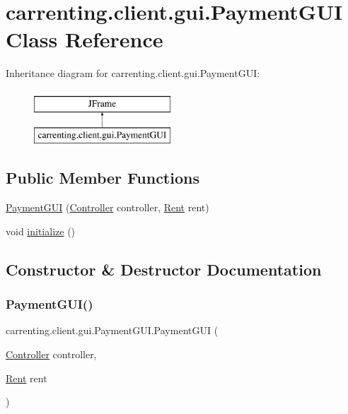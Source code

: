\hypertarget{classcarrenting_1_1client_1_1gui_1_1_payment_g_u_i}{}\section{carrenting.\+client.\+gui.\+Payment\+G\+UI Class Reference}
\label{classcarrenting_1_1client_1_1gui_1_1_payment_g_u_i}
Inheritance diagram for carrenting.\+client.\+gui.\+Payment\+G\+UI\+:\begin{figure}[H]
\begin{center}
\leavevmode
\includegraphics[height=2.000000cm]{classcarrenting_1_1client_1_1gui_1_1_payment_g_u_i}
\end{center}
\end{figure}
\subsection*{Public Member Functions}
\begin{DoxyCompactItemize}
\item 
\mbox{\hyperlink{classcarrenting_1_1client_1_1gui_1_1_payment_g_u_i_a1395ba2c408806ed435a49ce1463c11c}{Payment\+G\+UI}} (\mbox{\hyperlink{classcarrenting_1_1client_1_1_controller}{Controller}} controller, \mbox{\hyperlink{classcarrenting_1_1server_1_1jdo_1_1_rent}{Rent}} rent)
\item 
void \mbox{\hyperlink{classcarrenting_1_1client_1_1gui_1_1_payment_g_u_i_a19724d907d6135f0e7b18d43504b2cc8}{initialize}} ()
\end{DoxyCompactItemize}


\subsection{Constructor \& Destructor Documentation}
\mbox{\label{classcarrenting_1_1client_1_1gui_1_1_payment_g_u_i_a1395ba2c408806ed435a49ce1463c11c}} 
\subsubsection{\texorpdfstring{PaymentGUI()}{PaymentGUI()}}
{\footnotesize\ttfamily carrenting.\+client.\+gui.\+Payment\+G\+U\+I.\+Payment\+G\+UI (\begin{DoxyParamCaption}\item[{\mbox{\hyperlink{classcarrenting_1_1client_1_1_controller}{Controller}}}]{controller,  }\item[{\mbox{\hyperlink{classcarrenting_1_1server_1_1jdo_1_1_rent}{Rent}}}]{rent }\end{DoxyParamCaption})}



